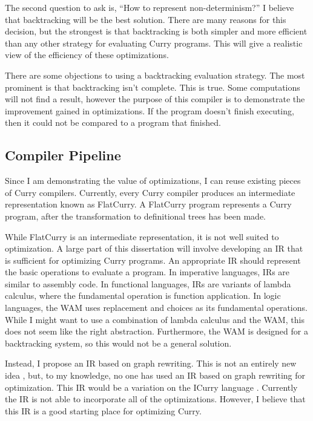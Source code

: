 The second question to ask is, ``How to represent non-determinism?''
I believe that backtracking will be the best solution.
There are many reasons for this decision, but the strongest is that backtracking
is both simpler and more efficient than any other strategy for evaluating Curry programs.
This will give a realistic view of the efficiency of these optimizations.

There are some objections to using a backtracking evaluation strategy.
The most prominent is that backtracking isn't complete.
This is true. Some computations will not find a result,
however the purpose of this compiler is to demonstrate the improvement gained in optimizations.
If the program doesn't finish executing, then it could not be compared to a program that finished.


\subsection{Compiler Pipeline}
Since I am demonstrating the value of optimizations, I can reuse existing pieces of Curry compilers.
Currently, every Curry compiler produces an intermediate representation known as FlatCurry.
A FlatCurry program represents a Curry program, after the transformation to definitional trees has been made.

While FlatCurry is an intermediate representation, it is not well suited to optimization.
A large part of this dissertation will involve developing an IR that is sufficient for optimizing Curry programs.
An appropriate IR should represent the basic operations to evaluate a program.
In imperative languages, IRs are similar to assembly code.
In functional languages, IRs are variants of lambda calculus, where the fundamental operation is function application.
In logic languages, the WAM uses replacement and choices as its fundamental operations.
While I might want to use a combination of lambda calculus and the WAM, this does not seem like the right abstraction.
Furthermore, the WAM is designed for a backtracking system, so this would not be a general solution.

Instead, I propose an IR based on graph rewriting.
This is not an entirely new idea \cite{graph_ir, dactl}, 
but, to my knowledge, no one has used an IR based on graph rewriting for optimization.
This IR would be a variation on the ICurry language \cite{AntoyJost16LOPSTR}.
Currently the IR is not able to incorporate all of the optimizations.
However, I believe that this IR is a good starting place for optimizing Curry.

